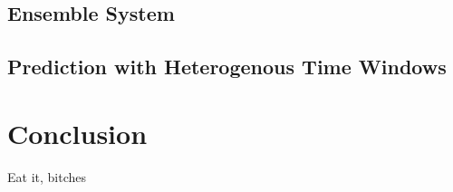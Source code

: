 \documentclass[10pt]{article}
\begin{document}

\subsection{Ensemble System}



\subsection{Prediction with Heterogenous Time Windows}



\section{Conclusion}
Eat it, bitches
\end{document}

